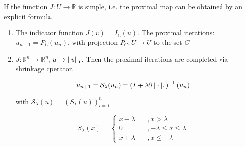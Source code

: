 \begin{example}
	If the function $J:U\rightarrow \mathbb{R}$ is simple, i.e. the proximal map can be obtained by an explicit formula. 
	\begin{enumerate}
		\item The indicator function $J(u)=I_C(u)$. The proximal iterations: $u_{n+1}=P_C(u_n)$, with projection $P_C:U\rightarrow U$ to the set $C$
		\item $J:\mathbb{R}^n \rightarrow \mathbb{R}^n$, $u\mapsto \left\lVert u\right\rVert_1$. Then the proximal iterations are completed via shrinkage operator.
		
		\begin{equation}
			u_{n+1} = \mathcal{S}_\lambda (u_n) = \left(I+\lambda \partial \left\lVert\cdot\right\rVert_1\right)^{-1} (u_n)
		\end{equation}
		
		with $\mathcal{S}_\lambda (u) = (S_\lambda(u))^n_{i=1} $.
		
		\begin{equation}
			S_\lambda(x)=\left\lbrace\begin{array}{ll}
			x-\lambda &\quad, x>\lambda \\
			0 &\quad , -\lambda \leq x \leq \lambda \\
			x+\lambda &\quad, x \leq -\lambda
			\end{array}\right.
		\end{equation}
	\end{enumerate}
\end{example}
